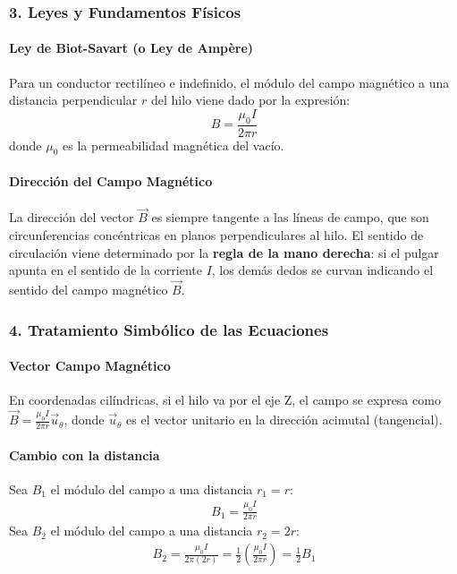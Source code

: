 \subsubsection*{3. Leyes y Fundamentos Físicos}
\paragraph*{Ley de Biot-Savart (o Ley de Ampère)}
Para un conductor rectilíneo e indefinido, el módulo del campo magnético a una distancia perpendicular $r$ del hilo viene dado por la expresión:
$$ B = \frac{\mu_0 I}{2\pi r} $$
donde $\mu_0$ es la permeabilidad magnética del vacío.
\paragraph*{Dirección del Campo Magnético}
La dirección del vector $\vec{B}$ es siempre tangente a las líneas de campo, que son circunferencias concéntricas en planos perpendiculares al hilo. El sentido de circulación viene determinado por la \textbf{regla de la mano derecha}: si el pulgar apunta en el sentido de la corriente $I$, los demás dedos se curvan indicando el sentido del campo magnético $\vec{B}$.

\subsubsection*{4. Tratamiento Simbólico de las Ecuaciones}
\paragraph*{Vector Campo Magnético}
En coordenadas cilíndricas, si el hilo va por el eje Z, el campo se expresa como $\vec{B} = \frac{\mu_0 I}{2\pi r} \vec{u}_\theta$, donde $\vec{u}_\theta$ es el vector unitario en la dirección acimutal (tangencial).

\paragraph*{Cambio con la distancia}
Sea $B_1$ el módulo del campo a una distancia $r_1=r$:
\begin{gather}
    B_1 = \frac{\mu_0 I}{2\pi r}
\end{gather}
Sea $B_2$ el módulo del campo a una distancia $r_2=2r$:
\begin{gather}
    B_2 = \frac{\mu_0 I}{2\pi (2r)} = \frac{1}{2} \left( \frac{\mu_0 I}{2\pi r} \right) = \frac{1}{2} B_1
\end{gather}

